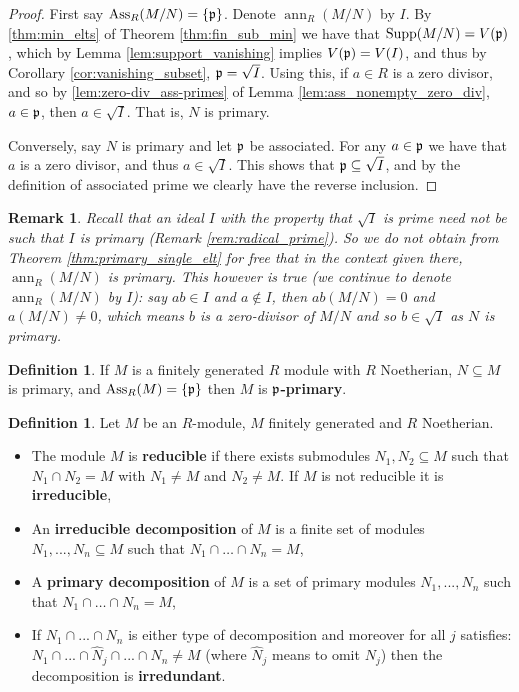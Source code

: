 \documentclass[12pt]{article}
\theoremstyle{plain}
\theoremstyle{definition}
\newtheorem{defn}[thm]{Definition} %
\newtheorem{remark}[thm]{Remark}
\begin{document}
\begin{proof}
First say $\operatorname{Ass}_R(M/N) = \lbrace \frak{p} \rbrace$. Denote $\operatorname{ann}_R(M/N)$ by $I$. By \eqref{thm:min_elts} of Theorem \ref{thm:fin_sub_min} we have that $\operatorname{Supp}(M/N) = V(\frak{p})$, which by Lemma \ref{lem:support_vanishing} implies $V(\frak{p}) = V(I)$, and thus by Corollary \ref{cor:vanishing_subset}, $\frak{p} = \sqrt{I}$. Using this, if $a \in R$ is a zero divisor, and so by \ref{lem:zero-div_ass-primes} of Lemma \ref{lem:ass_nonempty_zero_div}, $a \in \frak{p}$, then $a \in \sqrt{I}$. That is, $N$ is primary.

Conversely, say $N$ is primary and let $\frak{p}$ be associated. For any $a \in \frak{p}$ we have that $a$ is a zero divisor, and thus $a \in \sqrt{I}$. This shows that $\frak{p} \subseteq \sqrt{I}$, and by the definition of associated prime we clearly have the reverse inclusion.
\end{proof}
\begin{remark}
\emph{Recall that an ideal $I$ with the property that $\sqrt{I}$ is prime need not be such that $I$ is primary (Remark \ref{rem:radical_prime}). So we do not obtain from Theorem \ref{thm:primary_single_elt} for free that in the context given there, $\operatorname{ann}_R(M/N)$ is primary. This however is true (we continue to denote $\operatorname{ann}_R(M/N)$ by $I$): say $ab \in I$ and $a \not\in I$, then $ab(M/N) = 0$ and $a(M/N) \neq 0$, which means $b$ is a zero-divisor of $M/N$ and so $b \in \sqrt{I}$ as $N$ is primary.}
\end{remark}
\begin{defn}
If $M$ is a finitely generated $R$ module with $R$ Noetherian, $N \subseteq M$ is primary, and $\operatorname{Ass}_R(M) = \lbrace \frak{p}\rbrace$ then $M$ is \textbf{$\frak{p}$-primary}.
\end{defn}
\begin{defn}
Let $M$ be an $R$-module, $M$ finitely generated and $R$ Noetherian. 
\begin{itemize}
    \item The module $M$ is \textbf{reducible} if there exists submodules $N_1,N_2 \subseteq M$ such that $N_1 \cap N_2 = M$ with $N_1 \neq M$ and $N_2 \neq M$. If $M$ is not reducible it is \textbf{irreducible},
    \item An \textbf{irreducible decomposition} of $M$ is a finite set of modules $N_1,...,N_n \subseteq M$ such that $N_1 \cap \hdots \cap N_n = M$,
    \item A \textbf{primary decomposition} of $M$ is a set of primary modules $N_1,...,N_n$ such that $N_1 \cap \hdots \cap N_n = M$,
    \item If $N_1 \cap ... \cap N_n$ is either type of decomposition and moreover for all $j$ satisfies: $N_1 \cap ... \cap \hat{N}_j \cap ... \cap N_n \neq M$ (where $\hat{N}_j$ means to omit $N_j$) then the decomposition is \textbf{irredundant}.
\end{itemize}
\end{defn}
\end{document}

